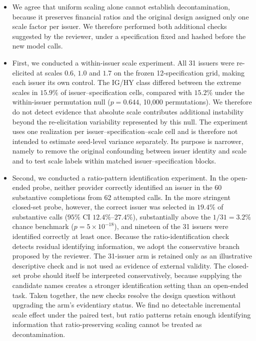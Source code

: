 \documentclass[11pt]{article}
\begin{document}
\begin{itemize}
\item We agree that uniform scaling alone cannot establish decontamination, because it preserves
financial ratios and the original design assigned only one scale factor per issuer. We therefore
performed both additional checks suggested by the reviewer, under a specification fixed and hashed
before the new model calls.
\item First, we conducted a within-issuer scale experiment. All 31 issuers were re-elicited at scales
$0.6$, $1.0$ and $1.7$ on the frozen 12-specification grid, making each issuer its own control. The
IG/HY class differed between the extreme scales in $15.9\%$ of issuer--specification cells,
compared with $15.2\%$ under the within-issuer permutation null ($p=0.644$, 10{,}000 permutations).
We therefore do not detect evidence that absolute scale contributes additional instability beyond
the re-elicitation variability represented by this null. The experiment uses one realization per
issuer--specification--scale cell and is therefore not intended to estimate seed-level variance
separately. Its purpose is narrower, namely to remove the original confounding between issuer
identity and scale and to test scale labels within matched issuer--specification blocks.
\item Second, we conducted a ratio-pattern identification experiment. In the open-ended probe, neither
provider correctly identified an issuer in the 60 substantive completions from 62 attempted calls.
In the more stringent closed-set probe, however, the correct issuer was selected in $19.4\%$ of
substantive calls ($95\%$ CI $12.4\%$--$27.4\%$), substantially above the $1/31=3.2\%$ chance
benchmark ($p=5\times10^{-18}$), and nineteen of the 31 issuers were identified correctly at least
once. Because the ratio-identification check detects residual identifying
information, we adopt the conservative branch proposed by the reviewer. The 31-issuer arm is
retained only as an illustrative descriptive check and is not used as evidence of external
validity. The closed-set probe should itself be interpreted conservatively, because supplying the
candidate names creates a stronger identification setting than an open-ended task. Taken together,
the new checks resolve the design question without upgrading the arm's evidentiary status. We find
no detectable incremental scale effect under the paired test, but ratio patterns retain enough
identifying information that ratio-preserving scaling cannot be treated as decontamination.
\end{itemize}
\end{document}
